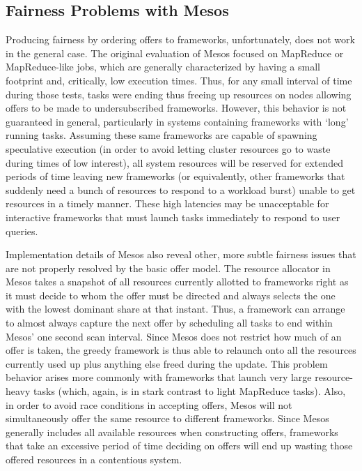 \subsection{Fairness Problems with Mesos}
Producing fairness by ordering offers to frameworks, unfortunately, does not work in the
general case. The original evaluation of Mesos focused on MapReduce or MapReduce-like jobs,
which are generally characterized by having a small footprint and, critically, low execution
times. Thus, for any small interval of time during those tests, tasks were ending thus freeing
up resources on nodes allowing offers to be made to undersubscribed frameworks. However, this
behavior is not guaranteed in general, particularly in systems containing frameworks with
`long' running tasks. Assuming these same frameworks are capable of spawning speculative
execution (in order to avoid letting cluster resources go to waste during times of low
interest), all system resources will be reserved for extended periods of time leaving new
frameworks (or equivalently, other frameworks that suddenly need a bunch of resources to
respond to a workload burst) unable to get resources in a timely manner. These high latencies
may be unacceptable for interactive frameworks that must launch tasks immediately to respond to
user queries.

Implementation details of Mesos also reveal other, more subtle fairness issues that are not
properly resolved by the basic offer model. The resource allocator in Mesos takes a snapshot of
all resources currently allotted to frameworks right as it must decide to whom the offer must
be directed and always selects the one with the lowest dominant share at that instant. Thus, a
framework can arrange to almost always capture the next offer by scheduling all tasks to end
within Mesos' one second scan interval. Since Mesos does not restrict how much of an offer is
taken, the greedy framework is thus able to relaunch onto all the resources currently used up
plus anything else freed during the update. This problem behavior arises more commonly with
frameworks that launch very large resource-heavy tasks (which, again, is in stark contrast to
light MapReduce tasks). Also, in order to avoid race conditions in accepting offers, Mesos will
not simultaneously offer the same resource to different frameworks. Since Mesos generally
includes all available resources when constructing offers, frameworks that take an excessive
period of time deciding on offers will end up wasting those offered resources in a contentious
system.


